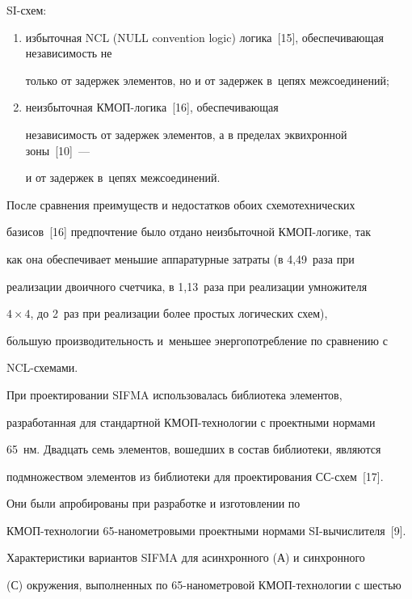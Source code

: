 SI-схем:

      \begin{enumerate}[(1)]

      \item  избыточная NCL (NULL convention logic) логика~[15], обеспечивающая независимость не

только от задержек элементов, но и от задержек в~цепях межсоединений;

      \item  неизбыточная КМОП-логика~[16], обеспечивающая

независимость от задержек элементов, а в пределах эквихронной зоны~[10]~---

и от задержек в~цепях межсоединений.

      \end{enumerate}



      После сравнения преимуществ и недостатков обоих схемотехнических

базисов~[16] предпочтение было отдано неизбыточной КМОП-ло\-ги\-ке, так

как она обеспечивает меньшие аппаратурные затраты (в 4,49~раза при

реализации двоичного счетчика, в 1,13~раза при реализации умножителя

$4\times4$, до 2~раз при реализации более простых логических схем),

б$\acute{\mbox{о}}$льшую производительность и~меньшее энергопотребление по сравнению с

NCL-схе\-мами.



      При проектировании SIFMA использовалась библиотека элементов,

разработанная для стандартной КМОП-тех\-но\-ло\-гии с проектными нормами

65~нм. Двадцать семь элементов, вошедших в состав библиотеки, являются

подмножеством элементов из библиотеки для проектирования СС-схем~[17].

Они были апробированы при разработке и изготовлении по

      КМОП-тех\-но\-ло\-гии 65-на\-но\-мет\-ро\-вы\-ми проектными нормами SI-вычислителя~[9].



      Характеристики вариантов SIFMA для асинхронного (А) и синхронного

(С) окружения, выполненных по 65-на\-но\-мет\-ро\-вой КМОП-тех\-но\-ло\-гии с шестью

